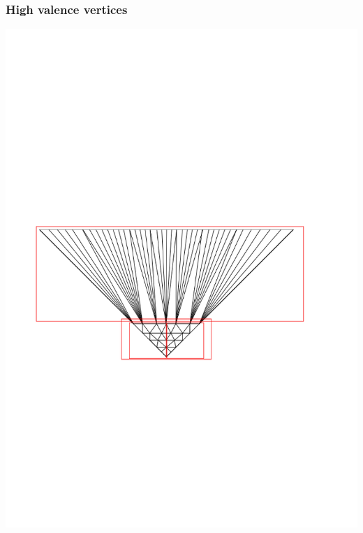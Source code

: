 \documentclass[14pt]{beamer}
\begin{document}
\begin{frame}
\frametitle{High valence vertices}
\begin{center}
\includegraphics[scale=0.6, trim = 0 0 0 300]{HV_4_boxes2.png}
\end{center}
\end{frame}
\end{document}
